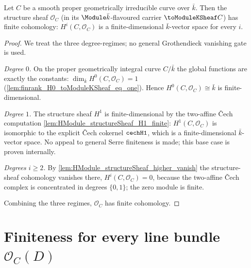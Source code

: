 \begin{lemma}

  \label{lem:HModule_structureSheaf_finite}
  Let \(C\) be a smooth proper geometrically irreducible curve over
  \(\bar k\). Then the structure sheaf \(\mathcal O_C\) (in its
  \(\Module \bar k\)-flavoured carrier \(\toModuleKSheaf C\)) has finite
  cohomology: \(H^i(C, \mathcal O_C)\) is a finite-dimensional
  \(\bar k\)-vector space for every \(i\).

\end{lemma}

\begin{proof}
        \leanok
  We treat the three degree-regimes; no general Grothendieck vanishing
  gate is used.

  \emph{Degree \(0\).} On the proper geometrically integral curve
  \(C / \bar k\) the global functions are exactly the constants:
  \(\dim_{\bar k} H^0(C, \mathcal O_C) = 1\)
  (\cref{lem:finrank_H0_toModuleKSheaf_eq_one}). Hence
  \(H^0(C, \mathcal O_C) \cong \bar k\) is finite-dimensional.

  \emph{Degree \(1\).} The structure sheaf \(H^1\) is finite-dimensional
  by the two-affine Čech computation
  \cref{lem:HModule_structureSheaf_H1_finite}: \(H^1(C, \mathcal O_C)\)
  is isomorphic to the explicit Čech cokernel \(\mathtt{cechH1}\), which is a
  finite-dimensional \(\bar k\)-vector space. No appeal to general Serre
  finiteness is made; this base case is proven internally.

  \emph{Degrees \(i \ge 2\).} By
  \cref{lem:HModule_structureSheaf_higher_vanish} the structure-sheaf
  cohomology vanishes there, \(H^i(C, \mathcal O_C) = 0\), because the
  two-affine Čech complex is concentrated in degrees \(\{0, 1\}\); the
  zero module is finite.

  Combining the three regimes, \(\mathcal O_C\) has finite cohomology.
\end{proof}

\section{Finiteness for every line bundle \(\mathcal O_C(D)\)}

